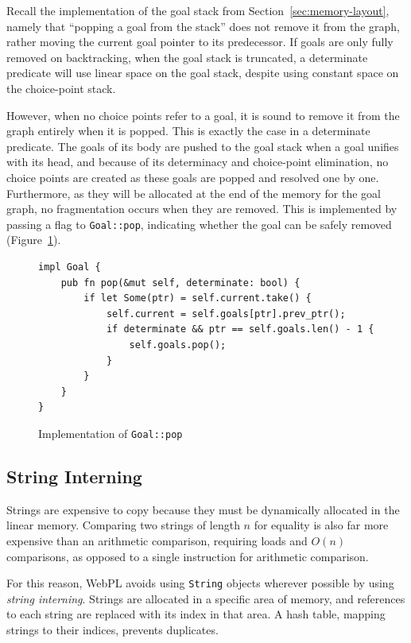 Recall the implementation of the goal stack from Section~\ref{sec:memory-layout}, namely that ``popping a goal from the stack'' does not remove it from the graph, rather moving the current goal pointer to its predecessor. If goals are only fully removed on backtracking, when the goal stack is truncated, a determinate predicate will use linear space on the goal stack, despite using constant space on the choice-point stack.

However, when no choice points refer to a goal, it is sound to remove it from the graph entirely when it is popped. This is exactly the case in a determinate predicate. The goals of its body are pushed to the goal stack when a goal unifies with its head, and because of its determinacy and choice-point elimination, no choice points are created as these goals are popped and resolved one by one. Furthermore, as they will be allocated at the end of the memory for the goal graph, no fragmentation occurs when they are removed. This is implemented by passing a flag to \texttt{Goal::pop}, indicating whether the goal can be safely removed (Figure~\ref{fig:goal-pop}).

\begin{figure}[H]
\centering
\begin{verbatim}
impl Goal {
    pub fn pop(&mut self, determinate: bool) {
        if let Some(ptr) = self.current.take() {
            self.current = self.goals[ptr].prev_ptr();
            if determinate && ptr == self.goals.len() - 1 {
                self.goals.pop();
            }
        }
    }
}
\end{verbatim}
\caption{Implementation of \texttt{Goal::pop}}
\label{fig:goal-pop}
\end{figure}

\subsection{String Interning}

Strings are expensive to copy because they must be dynamically allocated in the linear memory. Comparing two strings of length $n$ for equality is also far more expensive than an arithmetic comparison, requiring loads and $O(n)$ comparisons, as opposed to a single instruction for arithmetic comparison.

For this reason, WebPL avoids using \texttt{String} objects wherever possible by using \emph{string interning}. Strings are allocated in a specific area of memory, and references to each string are replaced with its index in that area. A hash table, mapping strings to their indices, prevents duplicates.

